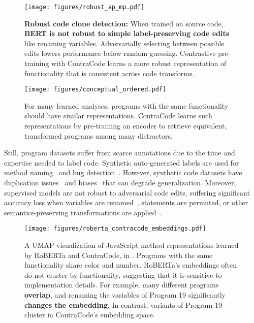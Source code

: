 \documentclass{article}
\newcommand{\ours}[0]{ContraCode}
\begin{document}
\begin{figure}[t]
    \centering
    \texttt{[image: figures/robust\_ap\_mp.pdf]}
    \caption{\textbf{Robust code clone detection:} When trained on source code, \textbf{BERT is not robust to simple label-preserving code edits} like renaming variables. Adversarially selecting between possible edits lowers performance below random guessing. Contrastive pre-training with \ours{} learns a more robust representation of functionality that is consistent across code transforms.}
    \label{fig:bert_motivation_robust}
\end{figure}

\begin{figure}[t]
    \centering
    \texttt{[image: figures/conceptual\_ordered.pdf]}
    \caption{For many learned analyses, programs with the same functionality should have similar representations. \ours{} learns such representations by pre-training an encoder to retrieve equivalent, transformed programs among many distractors.}
    \label{fig:conceptual}
\end{figure}

Still, program datasets suffer from scarce annotations due to the time and expertise needed to label code. Synthetic auto-generated labels are used for method naming~\citep{alon2018code2seq,alon2019code2vec} and bug detection~\citep{ferenc2018public,pradel2018deepbugs,benton2019defexts}. However, synthetic code datasets have duplication issues~\citep{10.1145/3359591.3359735} and biases~\citep{shin2019synthetic} that can degrade generalization.
Moreover, supervised models are not robust to adversarial code edits, suffering significant accuracy loss when variables are renamed~\cite{yefet2019adversarial}, statements are permuted, or other semantics-preserving transformations are applied~\cite{wang2019coset, wang2019learning, rabin2020evaluation}.

\begin{figure}[t]
    \centering
    \texttt{[image: figures/roberta\_contracode\_embeddings.pdf]}
    \caption{A UMAP visualization of JavaScript method representations learned by RoBERTa and \ours{}, in . Programs with the same functionality share color and number. RoBERTa's embeddings often do not cluster by functionality, suggesting that it is sensitive to implementation details. For example, many different programs {\color[HTML]{7030A0}\textbf{overlap}}, and renaming the variables of Program 19 significantly {\color[HTML]{C00000}\textbf{changes the embedding}}. In contrast, variants of Program 19 cluster in \ours{}'s embedding space.}
    \label{fig:bert_motivation_tsne}
\end{figure}
\end{document}
